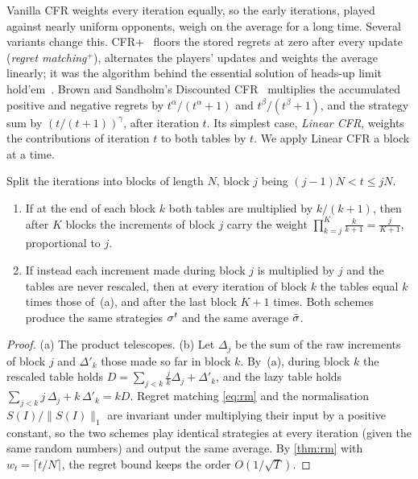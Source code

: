Vanilla CFR weights every iteration equally, so the early iterations, played against nearly uniform opponents, weigh
on the average for a long time. Several variants change this. CFR+~\cite{tammelin2014} floors the stored regrets at
zero after every update (\emph{regret matching}$^+$), alternates the players' updates and weights the average
linearly; it was the algorithm behind the essential solution of heads-up limit hold'em~\cite{bowling2015}. Brown and
Sandholm's Discounted CFR~\cite{brown2019discounted} multiplies the accumulated positive and negative regrets by
$t^\alpha/(t^\alpha+1)$ and $t^\beta/(t^\beta+1)$, and the strategy sum by $(t/(t+1))^\gamma$, after iteration $t$.
Its simplest case, \emph{Linear CFR}, weights the contributions of iteration $t$ to both tables by $t$. We apply Linear
CFR a block at a time.

\begin{proposition}\label{prop:linear-blocks}
Split the iterations into blocks of length $N$, block $j$ being $(j-1)N < t \le jN$.
\begin{enumerate}[label=(\alph*)]
\item If at the end of each block $k$ both tables are multiplied by $k/(k+1)$, then after $K$ blocks the increments
  of block $j$ carry the weight $\prod_{k=j}^{K} \frac{k}{k+1} = \frac{j}{K+1}$, proportional to $j$.
\item If instead each increment made during block $j$ is multiplied by $j$ and the tables are never rescaled, then at
  every iteration of block $k$ the tables equal $k$ times those of~(a), and after the last block $K+1$ times. Both
  schemes produce the same strategies $\sigma^t$ and the same average $\bar\sigma$.
\end{enumerate}
\end{proposition}

\begin{proof}
(a) The product telescopes. (b) Let $\Delta_j$ be the sum of the raw increments of block $j$ and $\Delta'_k$ those made
so far in block $k$. By~(a), during block $k$ the rescaled table holds $D = \sum_{j<k} \frac{j}{k}\Delta_j +
\Delta'_k$, and the lazy table holds $\sum_{j<k} j\,\Delta_j + k\,\Delta'_k = k D$. Regret matching \eqref{eq:rm} and
the normalisation $S(I)/\lVert S(I)\rVert_1$ are invariant under multiplying their input by a positive constant, so
the two schemes play identical strategies at every iteration (given the same random numbers) and output the same
average. By \cref{thm:rm} with $w_t = \lceil t/N \rceil$, the regret bound keeps the order $O(1/\sqrt T)$.
\end{proof}


